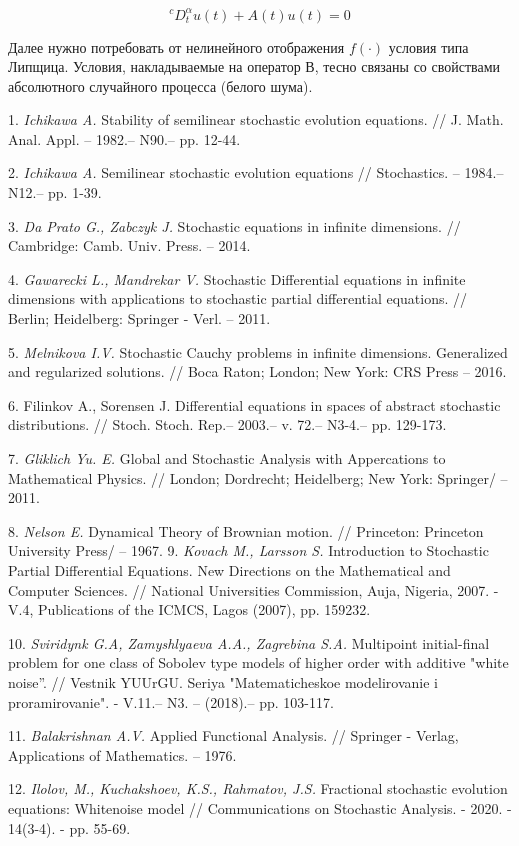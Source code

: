 \documentclass{vzmsthesis}
\begin{document}
$$^{c}D_{t}^{\alpha}u(t)+A(t)u(t)=0$$

Далее нужно потребовать от нелинейного отображения $f(\cdot)$ условия типа Липщица. Условия, накладываемые на оператор $В$, тесно связаны со свойствами абсолютного случайного процесса (белого шума). 









\litlist

1.	{\it Ichikawa A.} Stability of semilinear stochastic evolution equations. // J. Math. Anal. Appl. – 1982.– N90.– pp. 12-44.
 
2.	{\it Ichikawa A.} Semilinear stochastic evolution equations // Stochastics. – 1984.– N12.– pp. 1-39.

3.	{\it Da Prato G., Zabczyk J.} Stochastic equations in infinite dimensions. // Cambridge: Camb. Univ. Press. – 2014.

4.	{\it Gawarecki L., Mandrekar V.} Stochastic Differential equations in infinite dimensions with applications to stochastic partial differential equations. // Berlin; Heidelberg: Springer - Verl. – 2011.

5.	{\it Melnikova I.V.} Stochastic Cauchy problems in infinite dimensions. Generalized and regularized solutions. // Boca Raton; London; New York: CRS Press – 2016.

6.	{Filinkov A., Sorensen J.}  Differential equations in spaces of abstract stochastic distributions. // Stoch. Stoch. Rep.– 2003.– v. 72.– N3-4.– pp. 129-173.

7.	{\it Gliklich Yu. E.} Global and Stochastic Analysis with Appercations to Mathematical Physics. // London; Dordrecht; Heidelberg; New York: Springer/ – 2011.

8.	{\it Nelson E.} Dynamical Theory of Brownian motion. // Princeton: Princeton University Press/ – 1967.
9.	{\it Kovach M., Larsson S.} Introduction to Stochastic Partial Differential Equations. New Directions on the Mathematical and Computer Sciences. // National Universities Commission, Auja, Nigeria, 2007. -V.4, Publications of the ICMCS, Lagos (2007), pp. 159232.

10.	{\it Sviridynk G.A, Zamyshlyaeva A.A., Zagrebina S.A.} Multipoint initial-final problem for one class of Sobolev type models of higher order with additive "white noise”. // Vestnik YUUrGU. Seriya "Matematicheskoe modelirovanie i proramirovanie". - V.11.– N3. – (2018).– pp. 103-117.

11.	{\it Balakrishnan A.V.} Applied Functional Analysis. // Springer - Verlag, Applications of Mathematics. – 1976.

12. {\it Ilolov, M., Kuchakshoev, K.S., Rahmatov, J.S.} Fractional stochastic evolution equations: Whitenoise model // Communications on Stochastic Analysis. - 2020. - 14(3-4). - pp. 55-69.
\end{document}
